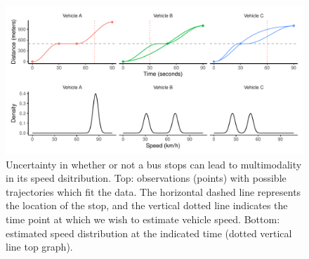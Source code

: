 \begin{knitrout}\small
{}\color{fgcolor}\begin{figure}

{\centering \includegraphics[width=\textwidth]{figure/vobs_multimode-1} 

}

\caption[Demonstration of multimodality in vehicle state]{Uncertainty in whether or not a bus stops can lead to multimodality in its speed dsitribution. Top: observations (points) with possible trajectories which fit the data. The horizontal dashed line represents the location of the stop, and the vertical dotted line indicates the time point at which we wish to estimate vehicle speed. Bottom: estimated speed distribution at the indicated time (dotted vertical line top graph).}\label{fig:vobs_multimode}
\end{figure}


\end{knitrout}


